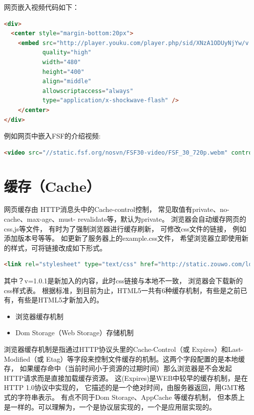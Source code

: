 \documentclass{book}
\begin{document}
网页嵌入视频代码如下：

\begin{lstlisting}[language=HTML]
<div>
  <center style="margin-bottom:20px">
    <embed src="http://player.youku.com/player.php/sid/XNzA1ODUyNjYw/v.swf" allowfullscreen="true"
           quality="high" 
           width="480" 
           height="400" 
           align="middle" 
           allowscriptaccess="always" 
           type="application/x-shockwave-flash" />
    </center>        
</div>
\end{lstlisting}

例如网页中嵌入FSF的介绍视频: 

\begin{lstlisting}[language=HTML]
<video src="//static.fsf.org/nosvn/FSF30-video/FSF_30_720p.webm" controls width="640" height="390"></video>
\end{lstlisting}

\section{缓存（Cache）}

网页缓存由 HTTP消息头中的Cache-control控制，
常见取值有private、no-cache、max-age、must- revalidate等，默认为private。
浏览器会自动缓存网页的css,js等文件，
有时为了强制浏览器进行缓存刷新，
可修改css文件的链接，
例如添加版本号等等。
如更新了服务器上的example.css文件，
希望浏览器立即使用新的样式，可将链接改成如下形式。

\begin{lstlisting}[language=HTML]
<link rel="stylesheet" type="text/css" href="http://static.zouwo.com/lottery/1.02/css/lottery2.css?v=1.0.1" />
\end{lstlisting}

其中？v=1.0.1是新加入的内容，此时css链接与本地不一致，
浏览器会下载新的css样式表。
根据标准，到目前为止，HTML5一共有6种缓存机制，有些是之前已有，有些是HTML5才新加入的。

\begin{itemize}
\item{浏览器缓存机制}
\item{Dom Storage（Web Storage）存储机制}
\end{itemize}

浏览器缓存机制是指通过HTTP协议头里的Cache-Control（或 Expires）和Last-Modified（或 Etag）等字段来控制文件缓存的机制。这两个字段配置的是本地缓存，
如果缓存命中（当前时间小于资源的过期时间）那么浏览器是不会发起HTTP请求而是直接加载缓存资源。
这(Expires)是WEB中较早的缓存机制，是在HTTP 1.0协议中实现的，
它描述的是一个绝对时间，由服务器返回，用GMT格式的字符串表示。
有点不同于Dom Storage、AppCache 等缓存机制，
但本质上是一样的。可以理解为，一个是协议层实现的，一个是应用层实现的。
\end{document}
